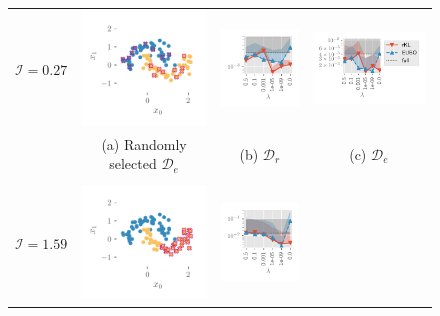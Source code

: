 \documentclass{article}
\theoremstyle{definition}
\newcommand{\mcl}[1]{\mathcal{#1}}
\newcommand{\dc}{\mcl{D}_r}
\newcommand{\dr}{\mcl{D}_e}
\begin{document}
\begin{figure}
\centering
\begin{tabular}{@{}c@{}c@{}c@{}c@{}}
$\mcl{I} = 0.27$
&
\includegraphics[trim={0mm 0mm 3mm 3mm}, clip,height=0.22\textwidth]{img/moon/moon_random_data.pdf}
&
\includegraphics[trim={3mm 0mm 3mm 3mm}, clip,height=0.22\textwidth]{img/likelihood_diff/moon_random_gauss_fullcov_likelihood_remain_retrain_f.pdf}
&
\includegraphics[trim={3mm 0mm 3mm 3mm}, clip,height=0.22\textwidth]{img/likelihood_diff/moon_random_gauss_fullcov_likelihood_remove_retrain_f_legend.pdf}
\\
&
(a) Randomly selected $\dr$
&
(b) $\dc$
&
(c) $\dr$
\\
\\
$\mcl{I} = 1.59$
&
\includegraphics[trim={0mm 0mm 3mm 3mm}, clip,height=0.22\textwidth]{img/moon/moon_rm_30_data.pdf}
&
\includegraphics[trim={3mm 0mm 3mm 3mm}, clip,height=0.22\textwidth]{img/likelihood_diff/moon_rm_30_gauss_fullcov_likelihood_remain_retrain_f.pdf}

\end{tabular}
\end{figure}
\end{document}
